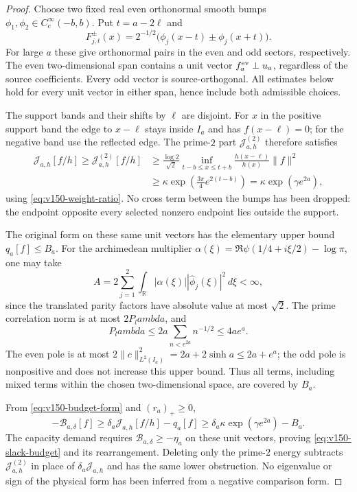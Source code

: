 \documentclass[11pt]{article}
\def\lambda{lambda}%
\theoremstyle{remark}
\begin{document}
\begin{proof}
Choose two fixed real even orthonormal smooth bumps
$\phi_1,\phi_2\in C_c^\infty(-b,b)$. Put $t=a-2\ell$ and
\[
 F_{j,t}^{\pm}(x)=2^{-1/2}\bigl(\phi_j(x-t)\pm\phi_j(x+t)\bigr).
\]
For large $a$ these give orthonormal pairs in the even and odd sectors,
respectively. The even two-dimensional span contains a unit vector
$f_a^{\rm ev}\perp u_a$, regardless of the source coefficients. Every
odd vector is source-orthogonal. All estimates below hold for every
unit vector in either span, hence include both admissible choices.

The support bands and their shifts by $\ell$ are disjoint. For $x$ in
the positive support band the edge to $x-\ell$ stays inside $I_a$ and
has $f(x-\ell)=0$; for the negative band use the reflected edge. The
prime-$2$ part $\mathcal J^{(2)}_{a,h}$ therefore satisfies
\begin{align*}
 \mathcal J_{a,h}[f/h]\ge\mathcal J^{(2)}_{a,h}[f/h]
 &\ge\frac{\log2}{\sqrt2}
       \inf_{t-b\le x\le t+b}\frac{h(x-\ell)}{h(x)}\|f\|^2\\
 &\ge\kappa\exp\!\left(\frac{3\pi}{4}e^{2(t-b)}\right)
 =\kappa\exp(\gamma e^{2a}),
\end{align*}
using \eqref{eq:v150-weight-ratio}. No cross term between the bumps
has been dropped: the endpoint opposite every selected nonzero endpoint
lies outside the support.

The original form on these same unit vectors has the elementary upper
bound $q_a[f]\le B_a$. For the archimedean multiplier
$\alpha(\xi)=\Re\psi(1/4+i\xi/2)-\log\pi$, one may take
\[
 A=2\sum_{j=1}^2\int_{\mathbb R}|\alpha(\xi)|
                      |\widehat\phi_j(\xi)|^2\,d\xi<\infty,
\]
since the translated parity factors have absolute value at most
$\sqrt2$. The prime correlation norm is at most $2P_\lambda$, and
\[
 P_\lambda\le 2a\sum_{n<e^{2a}}n^{-1/2}\le4ae^a.
\]
The even pole is at most $2\|c\|_{L^2(I_a)}^2
=2a+2\sinh a\le2a+e^a$; the odd pole is nonpositive and does not
increase this upper bound. Thus all terms, including mixed terms within
the chosen two-dimensional space, are covered by $B_a$.

From \eqref{eq:v150-budget-form} and $(r_a)_+\ge0$,
\[
 -\mathcal B_{a,\delta}[f]\ge
       \delta_a\mathcal J_{a,h}[f/h]-q_a[f]
 \ge\delta_a\kappa\exp(\gamma e^{2a})-B_a.
\]
The capacity demand requires $\mathcal B_{a,\delta}\ge-\eta_a$ on
these unit vectors, proving \eqref{eq:v150-slack-budget} and its
rearrangement. Deleting only the prime-$2$ energy subtracts
$\mathcal J^{(2)}_{a,h}$ in place of $\delta_a\mathcal J_{a,h}$ and
has the same lower obstruction. No eigenvalue or sign of the physical
form has been inferred from a negative comparison form.
\end{proof}
\end{document}
